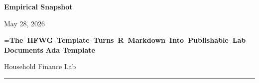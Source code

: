\documentclass[12pt]{article}
\newif\ifhfwganon
\begin{document}
\noindent
\begin{minipage}[t]{\textwidth}
\vspace{0pt}
{\small\sffamily\bfseries\color{hfwgaccent}Empirical Snapshot}\hfill
\ifhfwganon\else
{\small May 28, 2026}%
\fi
\par\vspace{0.35em}

\begingroup
{}=\hbox{\large\bfseries The HFWG Template Turns R Markdown Into
Publishable Lab Documents}%
\ifdim\wd0>\linewidth
  \noindent\resizebox{\linewidth}{!}{\large\bfseries The HFWG Template
Turns R Markdown Into Publishable Lab Documents}\par
\else
  {\large\bfseries The HFWG Template Turns R Markdown Into Publishable
Lab Documents\par}%
\fi
\endgroup
\vspace{0.3em}
{\scriptsize\bfseries
Ada Template%
}\par
{\scriptsize Household Finance Lab}\par
\end{minipage}\hfill
\par

\vspace{0.55em}
\noindent\textcolor{hfwgrule}{\rule{\textwidth}{0.7pt}}\par
\vspace{0.55em}
\end{document}
